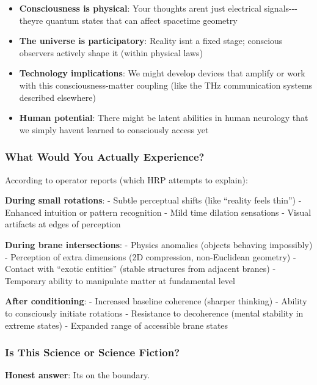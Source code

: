 \begin{itemize}
\item
  \textbf{Consciousness is physical}: Your thoughts
  aren\textquotesingle t just electrical
  signals-\/-\/-they\textquotesingle re quantum states that can affect
  spacetime geometry
\item
  \textbf{The universe is participatory}: Reality isn\textquotesingle t
  a fixed stage; conscious observers actively shape it (within physical
  laws)
\item
  \textbf{Technology implications}: We might develop devices that
  amplify or work with this consciousness-matter coupling (like the THz
  communication systems described elsewhere)
\item
  \textbf{Human potential}: There might be latent abilities in human
  neurology that we simply haven\textquotesingle t learned to
  consciously access yet
\end{itemize}

\subsubsection{What Would You Actually
Experience?}\label{what-would-you-actually-experience}

According to operator reports (which HRP attempts to explain):

\textbf{During small rotations}: - Subtle perceptual shifts (like
``reality feels thin'') - Enhanced intuition or pattern recognition -
Mild time dilation sensations - Visual artifacts at edges of perception

\textbf{During brane intersections}: - Physics anomalies (objects
behaving impossibly) - Perception of extra dimensions (2D compression,
non-Euclidean geometry) - Contact with ``exotic entities'' (stable
structures from adjacent branes) - Temporary ability to manipulate
matter at fundamental level

\textbf{After conditioning}: - Increased baseline coherence (sharper
thinking) - Ability to consciously initiate rotations - Resistance to
decoherence (mental stability in extreme states) - Expanded range of
accessible brane states

\subsubsection{Is This Science or Science
Fiction?}\label{is-this-science-or-science-fiction}

\textbf{Honest answer}: It\textquotesingle s on the boundary.

